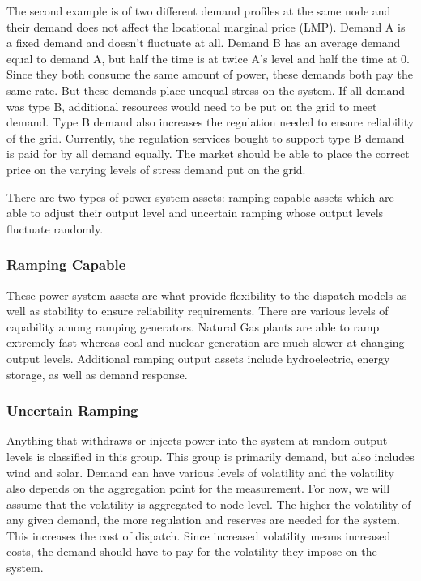 The second example is of two different demand profiles at the same node and their demand does not affect the locational marginal price (LMP).  Demand A is a fixed demand and doesn’t fluctuate at all.  Demand B has an average demand equal to demand A, but half the time is at twice A’s level and half the time at 0.  Since they both consume the same amount of power, these demands both pay the same rate.  But these demands place unequal stress on the system.  If all demand was type B, additional resources would need to be put on the grid to meet demand.  Type B demand also increases the regulation needed to ensure reliability of the grid.  Currently, the regulation services bought to support type B demand is paid for by all demand equally.  The market should be able to place the correct price on the varying levels of stress demand put on the grid.     

	There are two types of power system assets: ramping capable assets which are able to adjust their output level and uncertain ramping whose output levels fluctuate randomly.

\subsubsection{Ramping Capable}
These power system assets are what provide flexibility to the dispatch models as well as stability to ensure reliability requirements.  There are various levels of capability among ramping generators.  Natural Gas plants are able to ramp extremely fast whereas coal and nuclear generation are much slower at changing output levels.  Additional ramping output assets include hydroelectric, energy storage, as well as demand response.

\subsubsection{Uncertain Ramping}
Anything that withdraws or injects power into the system at random output levels is classified in this group.  This group is primarily demand, but also includes wind and solar.  Demand can have various levels of volatility and the volatility also depends on the aggregation point for the measurement.  For now, we will assume that the volatility is aggregated to node level.  The higher the volatility of any given demand, the more regulation and reserves are needed for the system.  This increases the cost of dispatch.  Since increased volatility means increased costs, the demand should have to pay for the volatility they impose on the system.  


